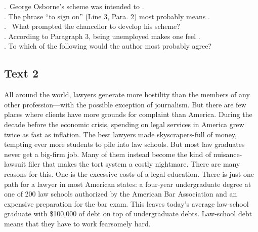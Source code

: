 \begin{questions} . George Osborne’s scheme was intended to \ltk{}.
\\ . The phrase “to sign on” (Line 3, Para. 2) most probably means \ltk{}.
\\ .  What prompted the chancellor to develop his scheme?
\\ . According to Paragraph 3, being unemployed makes one feel \ltk{}.
\\ . To which of the following would the author most probably agree?
\\ \end{questions}      \subsection{Text 2}
  All around the world, lawyers generate more hostility than the members of any other profession---with the possible exception of journalism. But there are few places where clients have more grounds for complaint than America.
   During the decade before the economic crisis, spending on legal services in America grew twice as fast as inflation. The best lawyers made skyscrapers-full of money, tempting ever more students to pile into law schools. But most law graduates never get a big-firm job. Many of them instead become the kind of nuisance-lawsuit filer that makes the tort system a costly nightmare.
   There are many reasons for this. One is the excessive costs of a legal education. There is just one path for a lawyer in most American states: a four-year undergraduate degree at one of 200 law schools authorized by the American Bar Association and an expensive preparation for the bar exam. This leaves today’s average law-school graduate with \$100,000 of debt on top of undergraduate debts. Law-school debt means that they have to work fearsomely hard.
